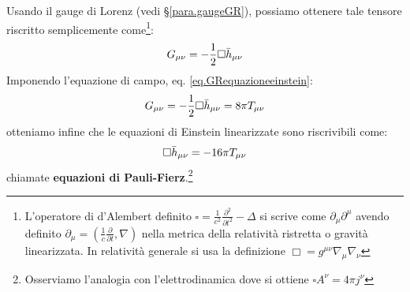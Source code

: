 Usando il gauge di Lorenz (vedi \S\ref{para.gaugeGR}), possiamo ottenere tale tensore riscritto semplicemente come\footnote{L'operatore di d'Alembert definito $\square = \frac{1}{c^2}\frac{\partial^2}{\partial t^2}-\Delta$ si scrive come $\partial_\mu \partial^\mu$ avendo definito $\partial_\mu = (\frac{1}{c}\frac{\partial}{\partial t}, \nabla )$ nella metrica della relatività ristretta o gravità linearizzata. In relatività generale si usa la definizione $\Box = g^{\mu\nu}\nabla_\mu\nabla_\nu$}:
\begin{equation}
    G_{\mu\nu} = -\frac{1}{2}\square\Bar{h}_{\mu\nu}
    \label{eq.Glinearizlorenz}
\end{equation}
Imponendo l'equazione di campo, eq. \ref{eq.GRequazioneeinstein}:
\begin{equation*}
    G_{\mu\nu} = -\frac{1}{2}\square\Bar{h}_{\mu\nu} = 8\pi T_{\mu\nu}
\end{equation*}
otteniamo infine che le equazioni di Einstein linearizzate sono riscrivibili come:
\begin{equation}
    \square\Bar{h}_{\mu\nu} = -16\pi T_{\mu\nu}
    \label{eq.GRpaulifierz}
\end{equation}
chiamate \textbf{equazioni di Pauli-Fierz}.\footnote{Osserviamo l'analogia con l'elettrodinamica dove si ottiene $\square A^\nu = 4\pi j^\nu$}
